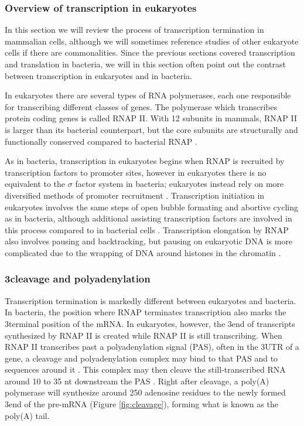 %
\subsubsection{Overview of transcription in eukaryotes}
In this section we will review the process of transcription termination in
mammalian cells, although we will sometimes reference studies of other
eukaryote cells if there are commonalities. Since the previous sections covered
transcription and translation in bacteria, we will in this section often point
out the contrast between transcription in eukaryotes and in bacteria.

In eukaryotes there are several types of RNA polymerases, each one responsible
for transcribing different classes of genes. The polymerase which transcribes
protein coding genes is called RNAP II. With 12 subunits in mammals, RNAP II is
larger than its bacterial counterpart, but the core subunits are structurally
and functionally conserved compared to bacterial RNAP \cite{ebright_rna_2000}.

As in bacteria, transcription in eukaryotes begins when RNAP is recruited by
transcription factors to promoter sites, however in eukaryotes there is no
equivalent to the $\sigma$ factor system in bacteria; eukaryotes instead rely
on more diversified methods of promoter recruitment
\cite{struhl_fundamentally_1999}. Transcription initiation in eukaryotes
involves the same steps of open bubble formating and abortive cycling as in
bacteria, although additional assisting transcription factors are involved in
this process compared to in bacterial cells \cite{wade_transition_2008}.
Transcription elongation by RNAP also involves pausing and backtracking, but
pausing on eukaryotic DNA is more complicated due to the wrapping of DNA around
histones in the chromatin \cite{sims_elongation_2004}.

\subsubsection{3\protect\ppp cleavage and polyadenylation}
Transcription termination is markedly different between eukaryotes and
bacteria. In bacteria, the position where RNAP terminates transcription also
marks the 3\ppp terminal position of the mRNA. In eukaryotes, however, the
3\ppp end of transcripts synthesized by RNAP II is created while RNAP II is
still transcribing. When RNAP II transcribes past a polyadenylation signal
(PAS), often in the 3\ppp UTR of a gene, a cleavage and polyadenylation complex
may bind to that PAS and to sequences around it \cite{colgan_mechanism_1997}.
This complex may then cleave the still-transcribed RNA around 10 to 35 nt
downstream the PAS \cite{proudfoot_ending_2011}. Right after cleavage, a
poly(A) polymerase will synthesize around 250 adenosine residues to the newly
formed 3\ppp end of the pre-mRNA (Figure \ref{fig:cleavage}), forming what is
known as the poly(A) tail.

